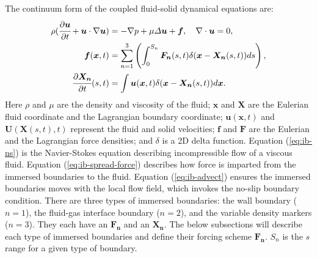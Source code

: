 \documentclass{jfm}
\begin{document}
The continuum form of the coupled fluid-solid dynamical equations are:
\begin{align}
\rho(\cfrac{\partial\bm{u}}{\partial t}+\bm{u}\cdot\nabla\bm{u}) & =-\nabla p+\mu\varDelta\bm{u}+\bm{f},\quad
\nabla\cdot\bm{u}=0, \label{eq:ib-ns}\\
\bm{f}(\bm{x},t) & = \sum_{n=1}^{3} \left( \int_{0}^{S_n} \bm{F_n}(s,t)\delta(\bm{x}-\bm{X_n}(s,t))ds \right), \label{eq:ib-spread-force}\\
\cfrac{\partial\bm{X_n}}{\partial t}(s,t) & =\int\bm{u}(\bm{x},t)\delta(\bm{x}-\bm{X_n}(s,t))d\bm{x}. \label{eq:ib-advect}
\end{align}
Here $\rho$ and $\mu$ are the density and viscosity of the fluid; $\boldsymbol{x}$ and $\boldsymbol{X}$ are the Eulerian fluid coordinate and the Lagrangian boundary coordinate; $\boldsymbol{u}(\boldsymbol{x},t)$ and $\boldsymbol{U}(\boldsymbol{X}(s,t),t)$ represent the fluid and solid velocities; $\boldsymbol{f}$ and $\boldsymbol{F}$ are the Eulerian and the Lagrangian force densities; and $\delta$ is a 2D delta function. Equation (\ref{eq:ib-ns}) is the Navier-Stokes equation describing incompressible flow of a viscous fluid. Equation (\ref{eq:ib-spread-force}) describes how force is imparted from the immersed boundaries to the fluid. Equation (\ref{eq:ib-advect}) ensures the immersed boundaries moves with the local flow field, which invokes the no-slip boundary condition. There are three types of immersed boundaries: the wall boundary ($n=1$), the fluid-gas interface boundary ($n=2$), and the variable density markers ($n=3$). They each have an $\boldsymbol{F_n}$ and an $\boldsymbol{X_n}$. The below subsections will describe each type of immersed boundaries and define their forcing scheme $\boldsymbol{F_n}$. $S_n$ is the $s$ range for a given type of boundary. 
\end{document}
